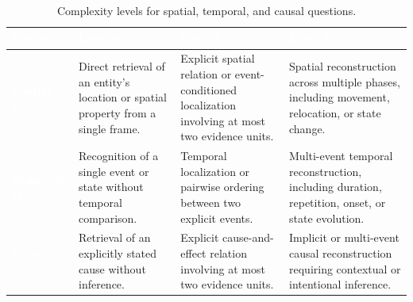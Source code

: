 \begin{table}[H]
    \centering
    \small
    \renewcommand{\arraystretch}{0.9}
    \begin{tabularx}{\textwidth}{|l|X|X|X|}
        \hline
        \rowcolor{EcoForestGreen}
        \textcolor{white}{\textbf{Category}} &
        \textcolor{white}{\textbf{Level 0}} &
        \textcolor{white}{\textbf{Level 1}} &
        \textcolor{white}{\textbf{Level 2}} \\
        \hline
        \cellcolor{EcoForestGreen}
        \textcolor{white}{\textbf{Spatial (S)}} &
        Direct retrieval of an entity's location or spatial property from a single frame. &
        Explicit spatial relation or event-conditioned localization involving at most two evidence units. &
        Spatial reconstruction across multiple phases, including movement, relocation, or state change. \\
        \hline
        \cellcolor{EcoForestGreen}
        \textcolor{white}{\textbf{Temporal (T)}} &
        Recognition of a single event or state without temporal comparison. &
        Temporal localization or pairwise ordering between two explicit events. &
        Multi-event temporal reconstruction, including duration, repetition, onset, or state evolution. \\
        \hline
        \cellcolor{EcoForestGreen}
        \textcolor{white}{\textbf{Causal (C)}} &
        Retrieval of an explicitly stated cause without inference. &
        Explicit cause-and-effect relation involving at most two evidence units. &
        Implicit or multi-event causal reconstruction requiring contextual or intentional inference. \\
        \hline
    \end{tabularx}
    \caption{Complexity levels for spatial, temporal, and causal questions.}
    \label{tab:question_classifications}
\end{table}
